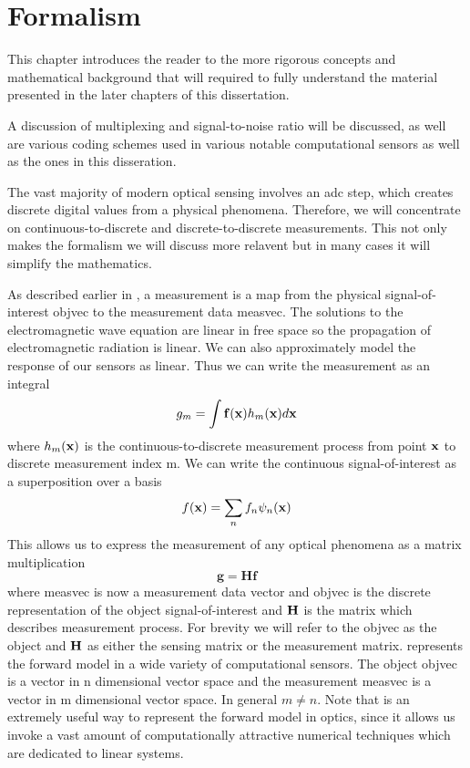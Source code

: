 \chapter{Formalism}\label{chap:Formalism}

This chapter introduces the reader to the more rigorous concepts and mathematical background that will required to fully understand the material presented in the later chapters of this dissertation. 

A discussion of multiplexing and signal-to-noise ratio will be discussed, as well are various coding schemes used in various notable computational sensors as well as the ones in this disseration. 


The vast majority of modern optical sensing involves an \acrfull{adc} step, which creates discrete digital values from a physical phenomena. Therefore, we will concentrate on continuous-to-discrete and discrete-to-discrete measurements. This not only makes the formalism we will discuss more relavent but in many cases it will simplify the mathematics. 

As described earlier in , a \gls{measurement} is a map from the physical signal-of-interest \gls{objvec} to the measurement data \gls{measvec}. The solutions to the electromagnetic wave equation are linear in free space so the propagation of electromagnetic radiation is linear. We can also approximately model the response of our sensors as linear. Thus we can write the measurement as an integral
%
\begin{equation}
	g_m = \int \mathbf{f}( \mathbf{x} ) h_m ( \mathbf{x} ) d \mathbf{x}
\end{equation}
%
where $ h_m ( \mathbf{x} ) $ is the continuous-to-discrete measurement process from point $ \mathbf{x} $ to discrete measurement index \gls{m}. We can write the continuous signal-of-interest as a superposition over a basis 
%
\begin{equation}
	f( \mathbf{x} ) = \sum_{n} f_n \psi_n ( \mathbf{x} )
\end{equation}
%
This allows us to express the measurement of any optical phenomena as a matrix multiplication
%
\begin{equation}
\mathbf{g} = \mathbf{Hf}
\label{eq:gHf}
\end{equation}
%
where \gls{measvec} is now a measurement data vector and \gls{objvec} is the discrete representation of the object signal-of-interest and $\mathbf{H}$ is the matrix which describes measurement process. For brevity we will refer to the \gls{objvec} as the object and $\mathbf{H}$ as either the sensing matrix or the measurement matrix.  represents the forward model in a wide variety of computational sensors. The object \gls{objvec} is a vector in \gls{n} dimensional vector space and the measurement \gls{measvec} is a vector in \gls{m} dimensional vector space. In general $m \neq n$. Note that  is an extremely useful way to represent the forward model in optics, since it allows us invoke a vast amount of computationally attractive numerical techniques which are dedicated to linear systems.

